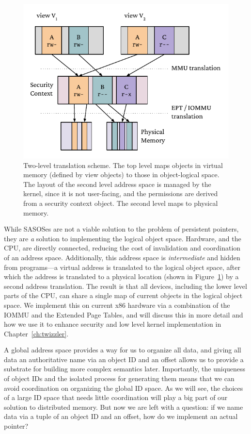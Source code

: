 \begin{figure}
    \centering
    \includegraphics[width=\linewidth]{fig/2level}
    \caption[Two-level translation scheme]{Two-level translation scheme. The top level maps objects in virtual memory (defined by view
        objects) to those in object-logical space. The layout of the second level address space is managed
        by the kernel, since it is not user-facing, and the permissions are derived from a security context
        object. The second level maps to physical memory.}
    \label{fig:twolevel}
\end{figure}


While SASOSes are not a viable solution to the problem of persistent pointers, they are
\emph{a} solution to implementing the logical object space.  Hardware, and the CPU, are
directly connected, reducing the cost of invalidation and coordination of an address space.
Additionally, this address space is \emph{intermediate} and hidden from programs---a virtual
address is translated to the logical object space, after which the address is translated to a
physical location (shown in Figure~\ref{fig:twolevel}) by a second address translation. The result is that all devices,
including the lower level parts of the CPU, can share a single map of current objects in the logical object space. We
implement this on current x86 hardware via a combination of the IOMMU and the Extended Page Tables, and will discuss
this in more detail and how we use it to enhance security and low level kernel implementation in Chapter~\ref{ch:twizzler}.

\begin{chconc}
    A global address space provides a way for us to organize all data, and giving all data an authoritative name via an
    object ID and an offset allows us to provide a substrate for building more complex semantics later. Importantly, the
    uniqueness of object IDs and the isolated process for generating them means that we can avoid coordination on
    organizing the global ID space. As we will see, the choices of a large ID space that needs little coordination will
    play a big part of our solution to distributed memory. But now we are left with a question: if we name data via a
    tuple of an object ID and an offset, how do we implement an actual pointer?
\end{chconc}